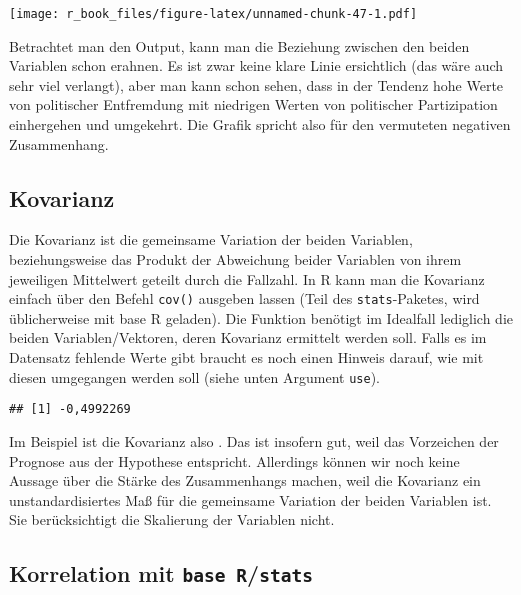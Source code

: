 \documentclass[
]{book}
\newenvironment{Shaded}{\begin{snugshade}}{\end{snugshade}}
\newcommand{\FunctionTok}[1]{\textcolor[rgb]{0.00,0.00,0.00}{#1}}
\newcommand{\NormalTok}[1]{#1}
\newcommand{\SpecialCharTok}[1]{\textcolor[rgb]{0.00,0.00,0.00}{#1}}
\begin{document}
\texttt{[image: r\_book\_files/figure-latex/unnamed-chunk-47-1.pdf]}

Betrachtet man den Output, kann man die Beziehung zwischen den beiden Variablen schon erahnen. Es ist zwar keine klare Linie ersichtlich (das wäre auch sehr viel verlangt), aber man kann schon sehen, dass in der Tendenz hohe Werte von politischer Entfremdung mit niedrigen Werten von politischer Partizipation einhergehen und umgekehrt. Die Grafik spricht also für den vermuteten negativen Zusammenhang.

\hypertarget{kovarianz}{%
\subsection{Kovarianz}\label{kovarianz}}

Die Kovarianz ist die gemeinsame Variation der beiden Variablen, beziehungsweise das Produkt der Abweichung beider Variablen von ihrem jeweiligen Mittelwert geteilt durch die Fallzahl. In R kann man die Kovarianz einfach über den Befehl \texttt{cov()} ausgeben lassen (Teil des \texttt{stats}-Paketes, wird üblicherweise mit base R geladen). Die Funktion benötigt im Idealfall lediglich die beiden Variablen/Vektoren, deren Kovarianz ermittelt werden soll. Falls es im Datensatz fehlende Werte gibt braucht es noch einen Hinweis darauf, wie mit diesen umgegangen werden soll (siehe unten Argument \texttt{use}).

\begin{Shaded}
\end{Shaded}

\begin{verbatim}
## [1] -0,4992269
\end{verbatim}

Im Beispiel ist die Kovarianz also . Das ist insofern gut, weil das Vorzeichen der Prognose aus der Hypothese entspricht. Allerdings können wir noch keine Aussage über die Stärke des Zusammenhangs machen, weil die Kovarianz ein unstandardisiertes Maß für die gemeinsame Variation der beiden Variablen ist. Sie berücksichtigt die Skalierung der Variablen nicht.

\hypertarget{korrelation-mit-base-rstats}{%
\subsection{\texorpdfstring{Korrelation mit \texttt{base\ R}/\texttt{stats}}{Korrelation mit base R/stats}}\label{korrelation-mit-base-rstats}}
\end{document}
